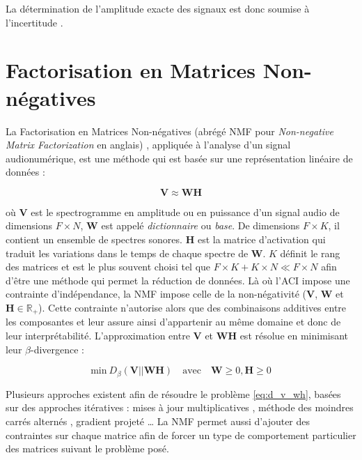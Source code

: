 La détermination de l'amplitude exacte des signaux est donc soumise à l'incertitude \cite{naik2011overview}.

\section{Factorisation en Matrices Non-négatives}

La Factorisation en Matrices Non-négatives (abrégé NMF pour \textit{Non-negative Matrix Factorization} en anglais) \cite{lee_learning_1999}, appliquée à l'analyse d'un signal audionumérique, est une méthode qui est basée sur une représentation linéaire de données :

\begin{equation}
\mathbf{V} \approx  \mathbf{WH}
\end{equation}

où $\mathbf{V}$ est le spectrogramme en amplitude ou en puissance d'un signal audio de dimensions $F \times N$, $\mathbf{W}$ est appelé \textit{dictionnaire} ou \textit{base}. De dimensions $F \times K$, il contient un ensemble de spectres sonores. $\mathbf{H}$ est la matrice d'activation qui traduit les variations dans le temps de chaque spectre de $\mathbf{W}$.  $K$ définit le rang des matrices et est le plus souvent choisi tel que $F\times K + K \times N \ll F \times N$ afin d'être une méthode qui permet la réduction de données.
Là où l'ACI impose une contrainte d'indépendance, la NMF impose celle de la \og non-négativité \fg{} ($\mathbf{V}$, $\mathbf{W}$ et $\mathbf{H} \in \mathbb{R}_+$). Cette contrainte n'autorise alors que des combinaisons additives entre les composantes et leur assure ainsi d'appartenir au même domaine et donc de leur interprétabilité. 
L'approximation entre $\mathbf{V}$ et $\mathbf{WH}$ est résolue en minimisant leur $\beta$-divergence :

\begin{equation}\label{eq:d_v_wh}
\text{min}~D_{\beta}\left(\textbf{V} \vert\vert \textbf{WH}\right) \quad \text{avec} \quad \mathbf{W} \geq 0, \mathbf{H} \geq 0
\end{equation}

Plusieurs approches existent afin de résoudre le problème \ref{eq:d_v_wh}, basées sur des approches itératives : mises à jour multiplicatives \cite{lee_algorithms_2000}, méthode des moindres carrés alternés \cite{cichocki_regularized_2007}, gradient projeté \cite{lin_projected_2007} \dots{} La NMF permet aussi d'ajouter des contraintes sur chaque matrice \cite{virtanen_monaural_2007, bertin2010enforcing} afin de forcer un type de comportement particulier des matrices suivant le problème posé.

